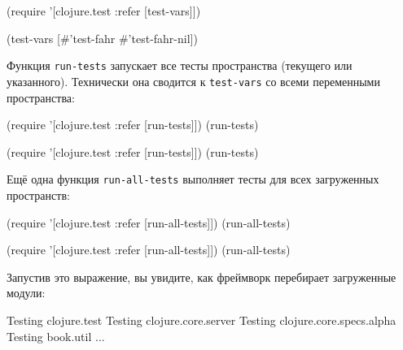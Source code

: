 \begin{english}
  \begin{clojure}
(require '[clojure.test :refer [test-vars]])

(test-vars [#'test-fahr #'test-fahr-nil])
  \end{clojure}
\end{english}

\fi


Функция \verb|run-tests| запускает все тесты пространства (текущего или
указанного). Технически она сводится к \verb|test-vars| со всеми переменными
пространства:

\ifx\devicetype\mobile

\begin{english}
  \begin{clojure}
(require
  '[clojure.test :refer [run-tests]])
(run-tests)
  \end{clojure}
\end{english}

\else

\begin{english}
  \begin{clojure}
(require '[clojure.test :refer [run-tests]])
(run-tests)
  \end{clojure}
\end{english}

\fi

Ещё одна функция \verb|run-all-tests| выполняет тесты для всех загруженных
пространств:

\ifx\devicetype\mobile

\begin{english}
  \begin{clojure}
(require
  '[clojure.test :refer [run-all-tests]])
(run-all-tests)
  \end{clojure}
\end{english}

\else

\begin{english}
  \begin{clojure}
(require '[clojure.test :refer [run-all-tests]])
(run-all-tests)
  \end{clojure}
\end{english}

\fi

Запустив это выражение, вы увидите, как фреймворк перебирает загруженные модули:

\begin{english}
  \begin{text}
Testing clojure.test
Testing clojure.core.server
Testing clojure.core.specs.alpha
Testing book.util
...
  \end{text}
\end{english}

